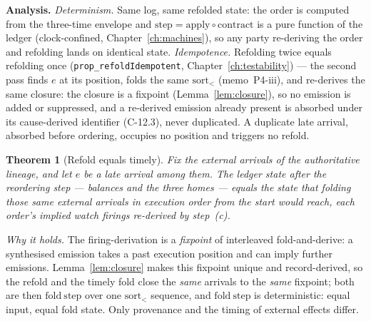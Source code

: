 \documentclass[11pt,a4paper]{article}
\newtheorem{theorem}[definition]{Theorem}
\begin{document}
\medskip\noindent\textbf{Analysis.} \emph{Determinism.} Same log, same refolded state: the order
is computed from the three-time envelope and $\mathrm{step}=\mathrm{apply}\circ\mathrm{contract}$
is a pure function of the ledger (clock-confined, Chapter~\ref{ch:machines}), so any party
re-deriving the order and refolding lands on identical state. \emph{Idempotence.} Refolding twice equals refolding once
(\texttt{prop\_refoldIdempotent}, Chapter~\ref{ch:testability}) --- the second pass finds $e$ at
its position, folds the same $\mathrm{sort}_<$ (memo~P4-iii), and re-derives the same closure:
the closure is a fixpoint (Lemma~\ref{lem:closure}), so no emission is added or suppressed, and a
re-derived emission already present is absorbed under its cause-derived identifier (C-12.3),
never duplicated. A duplicate late arrival, absorbed before ordering, occupies no position and
triggers no refold.

\begin{theorem}[Refold equals timely]\label{thm:refold}
Fix the external arrivals of the authoritative lineage, and let $e$ be a late arrival among
them. The ledger state after the reordering step --- balances and the three homes --- equals
the state that folding those same external arrivals in execution order from the start would
reach, each order's implied watch firings re-derived by step~(c).
\end{theorem}

\emph{Why it holds.} The firing-derivation is a \emph{fixpoint} of interleaved fold-and-derive:
a synthesised emission takes a past execution position and can imply further emissions.
Lemma~\ref{lem:closure} makes this fixpoint unique and record-derived, so the refold and the
timely fold close the \emph{same} arrivals to the \emph{same} fixpoint; both are then
$\mathrm{fold\ step}$ over one $\mathrm{sort}_<$ sequence, and $\mathrm{fold\ step}$ is
deterministic: equal input, equal fold state. Only provenance and the timing of external effects
differ.
\end{document}
